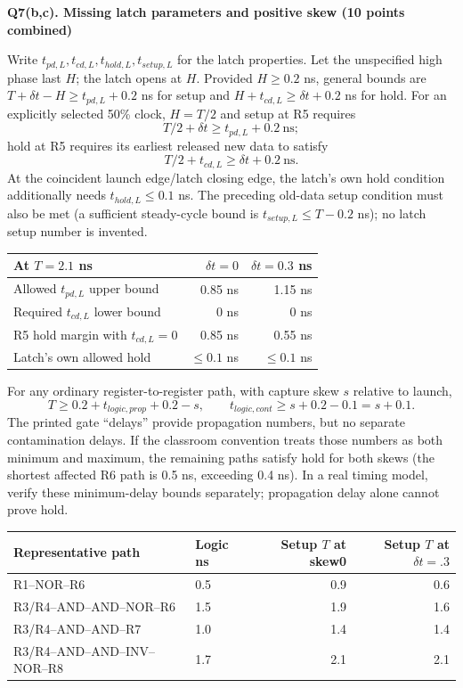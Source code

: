 \documentclass[10pt]{article}
\newcommand{\qheading}[1]{\par\medskip\textbf{#1}\par}
\begin{document}
\newpage
\qheading{Q7(b,c). Missing latch parameters and positive skew (10 points combined)}
Write $t_{pd,L},t_{cd,L},t_{hold,L},t_{setup,L}$ for the latch properties. Let the unspecified high phase last $H$; the latch opens at $H$. Provided $H\ge0.2$ ns, general bounds are $T+\delta t-H\ge t_{pd,L}+0.2$ ns for setup and $H+t_{cd,L}\ge\delta t+0.2$ ns for hold. For an explicitly selected 50\% clock, $H=T/2$ and setup at R5 requires
\[
T/2+\delta t\ge t_{pd,L}+0.2\ \mathrm{ns};
\]
hold at R5 requires its earliest released new data to satisfy
\[
T/2+t_{cd,L}\ge\delta t+0.2\ \mathrm{ns}.
\]
At the coincident launch edge/latch closing edge, the latch's own hold condition additionally needs $t_{hold,L}\le0.1$ ns. The preceding old-data setup condition must also be met (a sufficient steady-cycle bound is $t_{setup,L}\le T-0.2$ ns); no latch setup number is invented.
\begin{center}\begin{tabular}{lrr}\toprule
At $T=2.1$ ns&$\delta t=0$&$\delta t=0.3$ ns\\\midrule
Allowed $t_{pd,L}$ upper bound&0.85 ns&1.15 ns\\
Required $t_{cd,L}$ lower bound&0 ns&0 ns\\
R5 hold margin with $t_{cd,L}=0$&0.85 ns&0.55 ns\\
Latch's own allowed hold&$\le0.1$ ns&$\le0.1$ ns\\\bottomrule
\end{tabular}\end{center}
For any ordinary register-to-register path, with capture skew $s$ relative to launch,
\[
T\ge0.2+t_{logic,prop}+0.2-s,\qquad
t_{logic,cont}\ge s+0.2-0.1=s+0.1.
\]
The printed gate ``delays'' provide propagation numbers, but no separate contamination delays. If the classroom convention treats those numbers as both minimum and maximum, the remaining paths satisfy hold for both skews (the shortest affected R6 path is 0.5 ns, exceeding 0.4 ns). In a real timing model, verify these minimum-delay bounds separately; propagation delay alone cannot prove hold.
\begin{center}\begin{tabular}{llrr}\toprule
Representative path&Logic ns&Setup $T$ at skew0&Setup $T$ at $\delta t=.3$\\\midrule
R1--NOR--R6&0.5&0.9&0.6\\
R3/R4--AND--AND--NOR--R6&1.5&1.9&1.6\\
R3/R4--AND--AND--R7&1.0&1.4&1.4\\
R3/R4--AND--AND--INV--NOR--R8&1.7&2.1&2.1\\\bottomrule
\end{tabular}\end{center}
\end{document}

